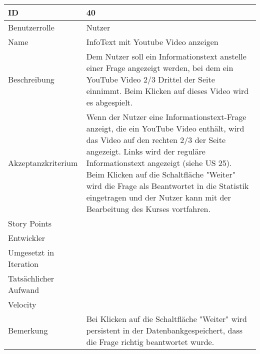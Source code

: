 \begin{tabularx}{\textwidth}{|p{}|X|}
	\hline
	ID & 40\\
	\hline
	Benutzerrolle & Nutzer\\
	\hline
	Name & InfoText mit Youtube Video anzeigen\\
	\hline
	Beschreibung & Dem Nutzer soll ein Informationstext anstelle einer Frage angezeigt werden, bei dem ein YouTube Video 2/3 Drittel der Seite einnimmt. Beim Klicken auf dieses Video wird es abgespielt.\\
	\hline
	Akzeptanzkriterium & Wenn der Nutzer eine Informationstext-Frage anzeigt, die ein YouTube Video enthält, wird das Video auf den rechten 2/3 der Seite angezeigt. Links wird der reguläre Informationstext angezeigt (siehe US 25). Beim Klicken auf die Schaltfläche "Weiter" wird die Frage als Beantwortet in die Statistik eingetragen und der Nutzer kann mit der Bearbeitung des Kurses vortfahren.\\
	\hline
	Story Points & \\
	\hline
	Entwickler & \\
	\hline
	Umgesetzt in Iteration & \\
	\hline
	Tatsächlicher Aufwand & \\
	\hline
	Velocity & \\
	\hline
	Bemerkung & Bei Klicken auf die Schaltfläche "Weiter" wird persistent in der Datenbankgespeichert, dass die Frage richtig beantwortet wurde.\\
	\hline
\end{tabularx}
\vspace{20pt}
